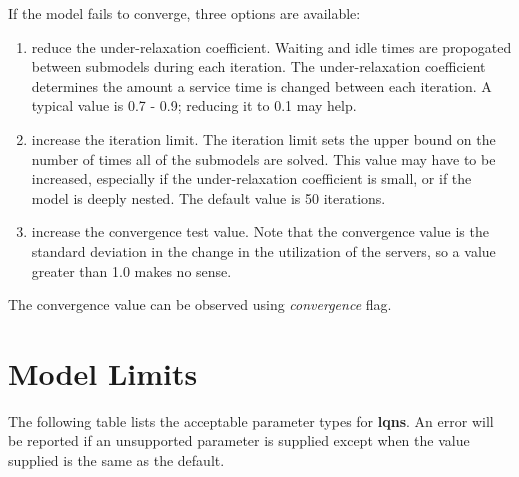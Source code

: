 If the model fails to converge, three options are available:
\begin{enumerate}
\item reduce the under-relaxation coefficient. Waiting and idle times are
propogated between submodels during each iteration. The
under-relaxation coefficient determines the amount a service time is
changed between each iteration. A typical value is 0.7 - 0.9; reducing
it to 0.1 may help.
\item increase the iteration limit. The iteration limit sets the upper bound
on the number of times all of the submodels are solved. This value may
have to be increased, especially if the under-relaxation coefficient
is small, or if the model is deeply nested. The default value is 50
iterations.
\item increase the convergence test value. Note that the convergence value
is the standard deviation in the change in the utilization of the
servers, so a value greater than 1.0 makes no sense.
\end{enumerate}


The convergence value can be observed using \emph{convergence} flag.
\section{Model Limits}
\label{sec:model-limits}
The following table lists the acceptable parameter types for
\textbf{lqns}.  An error will
be reported if an unsupported parameter is supplied except when the
value supplied is the same as the default.


